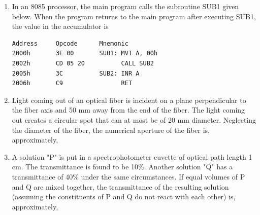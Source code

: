 \documentclass[journal,12pt,onecolumn]{IEEEtran}
\theoremstyle{remark}
\begin{document}
\begin{enumerate}
\vspace{0.5cm}

\item In an 8085 processor, the main program calls the subroutine SUB1 given below. When the program returns to the main program after executing SUB1, the value in the accumulator is
\begin{center}
\begin{verbatim}
Address     Opcode      Mnemonic
2000h       3E 00       SUB1: MVI A, 00h
2002h       CD 05 20          CALL SUB2
2005h       3C          SUB2: INR A
2006h       C9                RET
\end{verbatim}
\end{center}
\hfill{}\begin{enumerate}  \end{enumerate}

\vspace{0.5cm}

\item Light coming out of an optical fiber is incident on a plane perpendicular to the fiber axis and 50 mm away from the end of the fiber. The light coming out creates a circular spot that can at most be of 20 mm diameter. Neglecting the diameter of the fiber, the numerical aperture of the fiber is, approximately,
\hfill{}\begin{enumerate}  \end{enumerate}

\vspace{0.5cm}

\item A solution "P" is put in a spectrophotometer cuvette of optical path length 1 cm. The transmittance is found to be 10\%. Another solution "Q" has a transmittance of 40\% under the same circumstances. If equal volumes of P and Q are mixed together, the transmittance of the resulting solution (assuming the constituents of P and Q do not react with each other) is, approximately,
\hfill{}\begin{enumerate}  \end{enumerate}


\end{enumerate}
\end{document}
